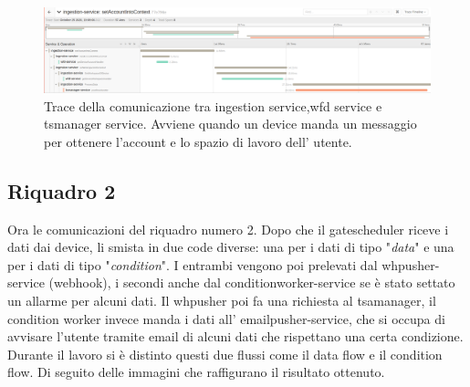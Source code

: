 \documentclass[a4paper,12pt,titlepage,italian,openany]{report}
\begin{document}
\begin{figure}[H]
    \includegraphics[scale=0.21]{75.png}
    \centering
    \caption{Trace della comunicazione tra ingestion service,wfd service e tsmanager service. Avviene quando un device manda un messaggio per ottenere l'account e lo spazio di lavoro dell' utente.}
\end{figure}
\subsection{Riquadro 2}
Ora le comunicazioni del riquadro numero 2. Dopo che il gatescheduler riceve i dati dai device, li smista in due code diverse: una per i dati di tipo "\textit{data}" e una per i dati di tipo "\textit{condition}". I entrambi vengono poi prelevati dal whpusher-service (webhook), i secondi anche dal conditionworker-service se è stato settato un  allarme per alcuni dati. Il whpusher poi fa una richiesta al tsamanager, il condition worker invece manda i dati all' emailpusher-service, che si occupa di avvisare l'utente tramite email di alcuni dati che rispettano una certa condizione.
\\Durante il lavoro si è distinto questi due flussi come il data flow e il condition flow. Di seguito delle immagini che raffigurano il risultato ottenuto.
\end{document}
